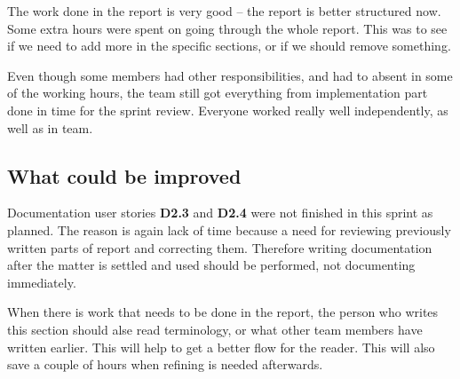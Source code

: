 The work done in the report is very good -- the report is better structured now.
Some extra hours were spent on going through the whole report. 
This was to see if we need to add more in the specific sections, or if we should remove something.  

Even though some members had other responsibilities, and had to absent in some of the working hours, the team still got everything from implementation part done in time for the sprint review. Everyone worked really well independently, as well as in team. 



\subsection{What could be improved}

Documentation user stories \textbf{D2.3} and \textbf{D2.4} were not finished in this sprint as planned.
The reason is again lack of time because a need for reviewing previously written parts of report and correcting them. 
Therefore writing documentation after the matter is settled and used should be performed, not documenting immediately.

When there is work that needs to be done in the report, the person who writes this section should alse read terminology, or what other team members have written earlier. 
This will help to get a better flow for the reader.
This will also save a couple of hours when refining is needed afterwards. 
